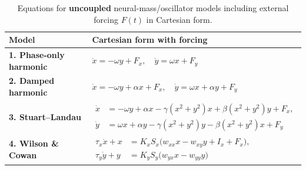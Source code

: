 \begin{landscape}
\begin{table}[p]
    \centering
    \scriptsize
    \renewcommand{\arraystretch}{1.3}
    \caption{Equations for \textbf{uncoupled} neural-mass/oscillator models including external forcing $F(t)$ in Cartesian form.}
    \label{tab:forced_models_cartesian}
    \begin{tabular}{@{}l  l@{}}
        \toprule
        \textbf{Model} & \textbf{Cartesian form with forcing} \\ 
        \midrule
        
        \addlinespace[2ex]
        \textbf{1. Phase-only harmonic} & $\displaystyle \dot{x} = -\omega y + F_x,\quad \dot{y} = \omega x + F_y$ \\[2ex]

        \addlinespace[2ex]
        \textbf{2. Damped harmonic} & $\displaystyle \dot{x} = -\omega y + \alpha x + F_x,\quad \dot{y} = \omega x + \alpha y + F_y$ \\[2ex]

        \addlinespace[2ex]
        \textbf{3. Stuart–Landau} & $\displaystyle
          \begin{aligned}
            \dot{x} &= -\omega y + \alpha x - \gamma(x^{2}+y^{2}) x + \beta(x^{2}+y^{2}) y + F_x,\\
            \dot{y} &= \omega x + \alpha y - \gamma(x^{2}+y^{2}) y - \beta(x^{2}+y^{2}) x + F_y
          \end{aligned}$ \\[2ex]


       \addlinespace[2ex]
        \textbf{4. Wilson \& Cowan} & $\displaystyle
          \begin{aligned}
            \tau_x \dot{x} + x  &=  K_x S_x\bigl(w_{xx} x - w_{xy} y + I_x + F_x\bigr),\\
            \tau_y \dot{y} + y  &= K_y S_y\bigl(w_{yx} x - w_{yy} y \bigr)
          \end{aligned}$ \\[2ex]


\end{tabular}
\end{table}
\end{landscape}
